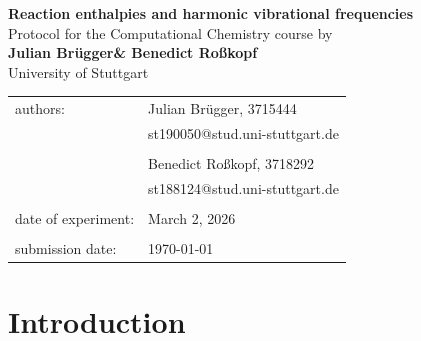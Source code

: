 \documentclass[a4paper,12pt]{scrartcl}
\makeatletter
\newcommand{\VERSUCHSDATUM}{March 2, 2026}
\newcommand{\PROTOKOLLDATUM}{\today}
\newcommand{\VerfasserEINS}{Julian Brügger}
\newcommand{\MatNoEINS}{3715444}
\newcommand{\EmailEINS}{st190050@stud.uni-stuttgart.de}
\newcommand{\VerfasserZWEI}{Benedict Roßkopf}
\newcommand{\MatNoZWEI}{3718292}
\newcommand{\EmailZWEI}{st188124@stud.uni-stuttgart.de}
\newcommand{\VERSUCHSNAME}{Reaction enthalpies and harmonic vibrational frequencies}
\makeatother
\begin{document}
\begin{titlepage}
\begin{center}
\Huge{\textbf{\VERSUCHSNAME}}\\
\vspace{10mm}
\Large{Protocol for the Computational Chemistry course by \\ \textbf{\VerfasserEINS\;\& \VerfasserZWEI }}\\
\vspace{10mm} 
\Large{University of Stuttgart}\\
\end{center}
\begin{center}
\begin{tabular}{ll}
\large{authors:}        & \large{\VerfasserEINS, \MatNoEINS} \\
                        & \large{\EmailEINS} \\
                        \vspace{2mm}\\
                        & \large{\VerfasserZWEI, \MatNoZWEI} \\
                        & \large{\EmailZWEI} \\						
                        \vspace{0cm}\\
\large{date of experiment:}	& \large{\VERSUCHSDATUM} \\
\vspace{0cm}\\
\large{submission date:} & \large{\PROTOKOLLDATUM}
\end{tabular}
\end{center}
\end{titlepage}

\section{Introduction}
\end{document}
